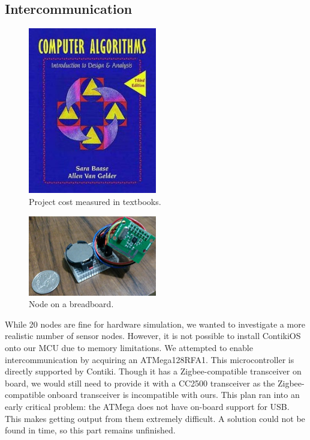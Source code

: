 \subsection{Intercommunication}

\begin{figure}[h!]
  \centering
  \includegraphics[width=0.5\textwidth]{images/textbook.png}
  \caption{Project cost measured in textbooks.
  \label{img:flowchart}
  }
\end{figure}

\begin{figure}[h!]
  \centering
  \includegraphics[width=0.5\textwidth]{images/phone_picture.png}
  \caption{Node on a breadboard.
  \label{img:flowchart}
  }
\end{figure}

While 20 nodes are fine for hardware simulation, we wanted to investigate a more realistic number of sensor nodes. However, it is not possible to install ContikiOS onto our MCU due to memory limitations. We attempted to enable intercommunication by acquiring an ATMega128RFA1. This microcontroller is directly supported by Contiki. Though it has a Zigbee-compatible transceiver on board, we would still need to provide it with a CC2500 transceiver as the Zigbee-compatible onboard transceiver is incompatible with ours. This plan ran into an early critical problem: the ATMega does not have on-board support for USB. This makes getting output from them extremely difficult. A solution could not be found in time, so this part remains unfinished.
